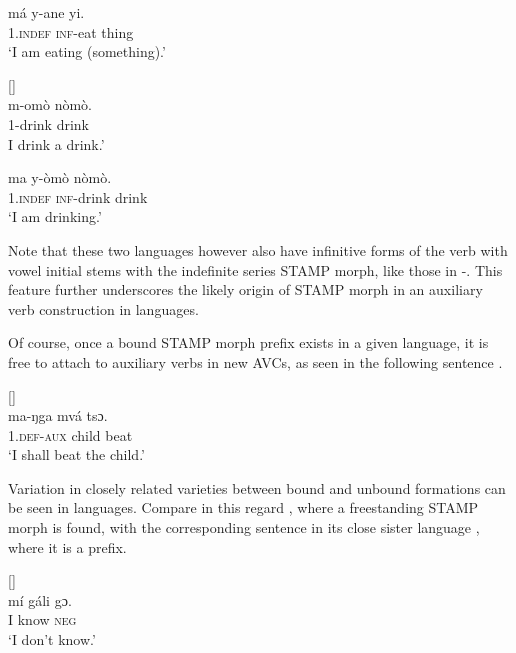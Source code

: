 \documentclass[output=paper]{langsci/langscibook}
\begin{document}
\ex \label{ex:anderson:55b}
\gll má    y-ane    yi.\\
 1.\textsc{indef}  \textsc{inf}-eat    thing\\
\glt `I am eating (something).'
\z
\z


\newpage 
\ea\label{ex:anderson:56}
 \citep[75]{TuckerBryan1966}     []\\
\ea\label{ex:anderson:56a}
\gll m-omò    nòmò.\\
  1-drink   drink    \\
\glt I drink a drink.'     


\ex \label{ex:anderson:56b}
\gll ma     y-òmò    nòmò.\\
  \textsc{1.indef}  \textsc{inf}-drink   drink\\
\glt `I am drinking.'
\z
\z

Note that these two languages however also have infinitive forms of the verb with vowel initial stems with the indefinite series STAMP morph, like those in -. This feature further underscores the likely origin of STAMP morph in an auxiliary verb construction in  languages.

Of course, once a bound STAMP morph prefix exists in a given  language, it is free to attach to auxiliary verbs in new AVCs, as seen in the following  sentence .

\ea\label{ex:anderson:57}
 \citep[46, 47]{TuckerBryan1966}      []\\
\gll ma-ŋga  mvá  tsɔ.\\
\textsc{1.def-aux}  child  beat\\
\glt `I shall beat the child.'    
\z

Variation in closely related varieties between bound and unbound formations can be seen in  languages. Compare in this regard  , where a freestanding STAMP morph is found, with the corresponding sentence in its close sister language  , where it is a prefix.

\ea\label{ex:anderson:58}
 \citep[91]{Boyeldieu1990}           []\\
\gll mí  gáli  gɔ.          \\
I   know  \textsc{neg}      \\
\glt `I don't know.'
\z
\end{document}
